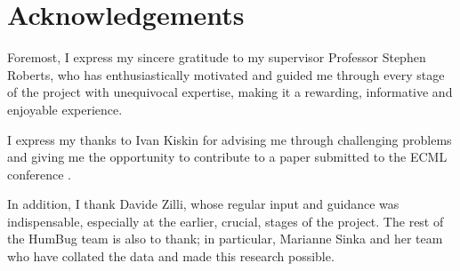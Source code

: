 \section*{Acknowledgements}
Foremost, I express my sincere gratitude to my supervisor Professor Stephen Roberts, who has enthusiastically motivated and guided me through every stage of the project with unequivocal expertise, making it a rewarding, informative and enjoyable experience.

I express my thanks to Ivan Kiskin for advising me through challenging problems and giving me the opportunity to contribute to a paper submitted to the ECML conference \cite{Kiskin}.

In addition, I thank Davide Zilli, whose regular input and guidance was indispensable, especially at the earlier, crucial, stages of the project. The rest of the HumBug team is also to thank; in particular, Marianne Sinka and her team who have collated the data and made this research possible.